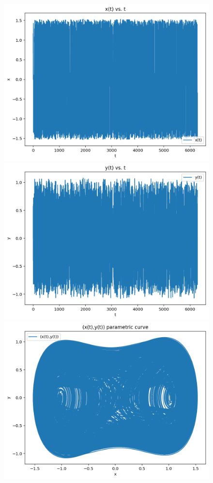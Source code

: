 \documentclass{article}
\begin{document}
\begin{figure}[h!]
\includegraphics[scale=0.4]{x(t)8.png}
\includegraphics[scale=0.4]{y(t)8.png}
\includegraphics[scale=0.4]{parametriccurve8.png}

\end{figure}
\end{document}
